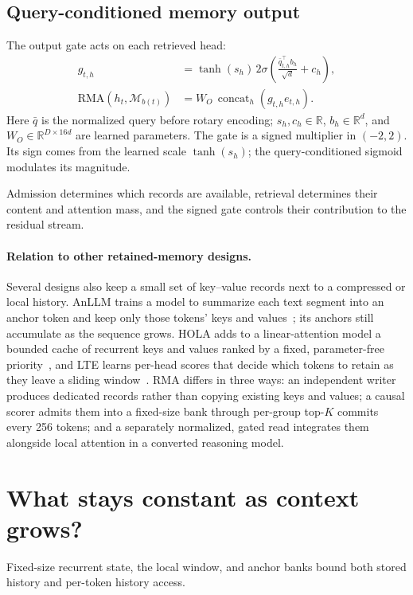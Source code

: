 \subsection{Query-conditioned memory output}
The output gate acts on each retrieved head:
\begin{align}
g_{t,h}&=\tanh(s_h)\,2\sigma\!\left(\frac{\bar q_{t,h}^{\top}b_h}{\sqrt d}+c_h\right),\\
\mathrm{RMA}(h_t,\mathcal M_{b(t)})&=W_O\,\operatorname{concat}_{h}\!\left(g_{t,h}e_{t,h}\right).
\end{align}
Here $\bar q$ is the normalized query before rotary encoding; $s_h,c_h\in\mathbb R$, $b_h\in\mathbb R^d$, and $W_O\in\mathbb R^{D\times16d}$ are learned parameters. The gate is a signed multiplier in $(-2,2)$. Its sign comes from the learned scale $\tanh(s_h)$; the query-conditioned sigmoid modulates its magnitude.

Admission determines which records are available, retrieval determines their content and attention mass, and the signed gate controls their contribution to the residual stream.

\paragraph{Relation to other retained-memory designs.}
Several designs also keep a small set of key--value records next to a compressed or local history. AnLLM trains a model to summarize each text segment into an anchor token and keep only those tokens' keys and values~\cite{anllm}; its anchors still accumulate as the sequence grows. HOLA adds to a linear-attention model a bounded cache of recurrent keys and values ranked by a fixed, parameter-free priority~\cite{hola}, and LTE learns per-head scores that decide which tokens to retain as they leave a sliding window~\cite{lte}. RMA differs in three ways: an independent writer produces dedicated records rather than copying existing keys and values; a causal scorer admits them into a fixed-size bank through per-group top-$K$ commits every 256 tokens; and a separately normalized, gated read integrates them alongside local attention in a converted reasoning model.

\section{What stays constant as context grows?}
\label{sec:complexity}

Fixed-size recurrent state, the local window, and anchor banks bound both stored history and per-token history access.

